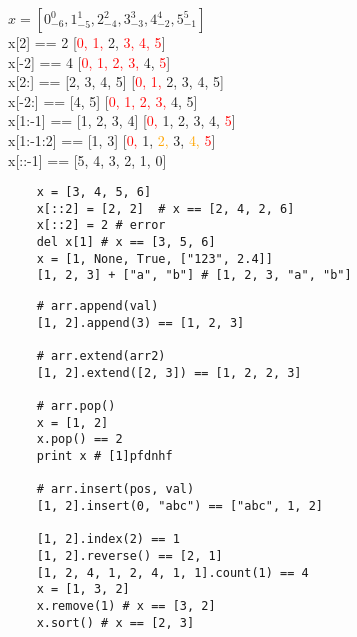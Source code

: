 \documentclass{article}
\begin{document}
{
\Huge
\begin{flushleft}
$x = [0_{-6}^{0}, 1_{-5}^{1}, 2_{-4}^{2}, 3_{-3}^{3}, 4_{-2}^{4}, 5_{-1}^{5}]$ \\
\vspace{0.5cm}
x[2] == 2 \hspace{2cm}[\textcolor{red}{0, 1,} 2, \textcolor{red}{3, 4, 5}] \\
\vspace{0.5cm}
x[-2] == 4 \hspace{2cm}[\textcolor{red}{0, 1, 2, 3,} 4, \textcolor{red}{5}] \\
\vspace{0.5cm}
x[2:] == [2, 3, 4, 5] \hspace{2cm}[\textcolor{red}{0, 1, }2, 3, 4, 5] \\
\vspace{0.5cm}
x[-2:] == [4, 5] \hspace{2cm}[\textcolor{red}{0, 1, 2, 3,} 4, 5] \\
\vspace{0.5cm}
x[1:-1] == [1, 2, 3, 4] \hspace{2cm}[\textcolor{red}{0,} 1, 2, 3, 4, \textcolor{red}{5}] \\
\vspace{0.5cm}
x[1:-1:2] == [1, 3] \hspace{2cm}[\textcolor{red}{0,} 1, \textcolor{orange}{2,} 3, \textcolor{orange}{4,} \textcolor{red}{5}] \\
\vspace{0.5cm}
x[::-1] == [5, 4, 3, 2, 1, 0] \\
\end{flushleft}
}
\newpage

\vspace{15pt}
\begin{lstlisting}
    x = [3, 4, 5, 6]
    x[::2] = [2, 2]  # x == [2, 4, 2, 6]
    x[::2] = 2 # error
    del x[1] # x == [3, 5, 6]
    x = [1, None, True, ["123", 2.4]]
    [1, 2, 3] + ["a", "b"] # [1, 2, 3, "a", "b"]
\end{lstlisting}
\newpage

{\Large
\vspace{15pt}
\begin{lstlisting}
    # arr.append(val)
    [1, 2].append(3) == [1, 2, 3]

    # arr.extend(arr2)
    [1, 2].extend([2, 3]) == [1, 2, 2, 3]

    # arr.pop()
    x = [1, 2]
    x.pop() == 2
    print x # [1]pfdnhf 

    # arr.insert(pos, val)
    [1, 2].insert(0, "abc") == ["abc", 1, 2]

    [1, 2].index(2) == 1
    [1, 2].reverse() == [2, 1]
    [1, 2, 4, 1, 2, 4, 1, 1].count(1) == 4
    x = [1, 3, 2]
    x.remove(1) # x == [3, 2]
    x.sort() # x == [2, 3]
\end{lstlisting}
}
\newpage
\end{document}
